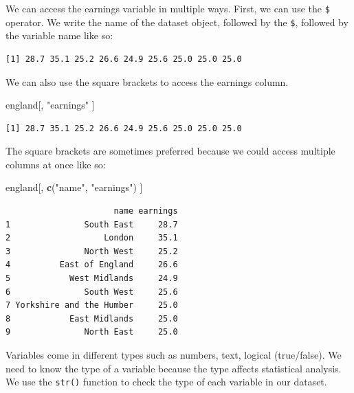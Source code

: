 \documentclass[]{article}
\newenvironment{Shaded}{\begin{snugshade}}{\end{snugshade}}
\newcommand{\KeywordTok}[1]{\textcolor[rgb]{0.13,0.29,0.53}{\textbf{#1}}}
\newcommand{\NormalTok}[1]{#1}
\newcommand{\OperatorTok}[1]{\textcolor[rgb]{0.81,0.36,0.00}{\textbf{#1}}}
\newcommand{\StringTok}[1]{\textcolor[rgb]{0.31,0.60,0.02}{#1}}
\begin{document}
We can access the earnings variable in multiple ways. First, we can use the \texttt{\$} operator. We write the name of the dataset object, followed by the \texttt{\$}, followed by the variable name like so:

\begin{Shaded}
\end{Shaded}

\begin{verbatim}
[1] 28.7 35.1 25.2 26.6 24.9 25.6 25.0 25.0 25.0
\end{verbatim}

We can also use the square brackets to access the earnings column.

\begin{Shaded}
\begin{Highlighting}[]
\NormalTok{england[, }\StringTok{"earnings"}\NormalTok{ ]}
\end{Highlighting}
\end{Shaded}

\begin{verbatim}
[1] 28.7 35.1 25.2 26.6 24.9 25.6 25.0 25.0 25.0
\end{verbatim}

The square brackets are sometimes preferred because we could access multiple columns at once like so:

\begin{Shaded}
\begin{Highlighting}[]
\NormalTok{england[, }\KeywordTok{c}\NormalTok{(}\StringTok{"name"}\NormalTok{, }\StringTok{"earnings"}\NormalTok{) ]}
\end{Highlighting}
\end{Shaded}

\begin{verbatim}
                      name earnings
1               South East     28.7
2                   London     35.1
3               North West     25.2
4          East of England     26.6
5            West Midlands     24.9
6               South West     25.6
7 Yorkshire and the Humber     25.0
8            East Midlands     25.0
9               North East     25.0
\end{verbatim}

Variables come in different types such as numbers, text, logical (true/false). We need to know the type of a variable because the type affects statistical analysis. We use the \texttt{str()} function to check the type of each variable in our dataset.
\end{document}
